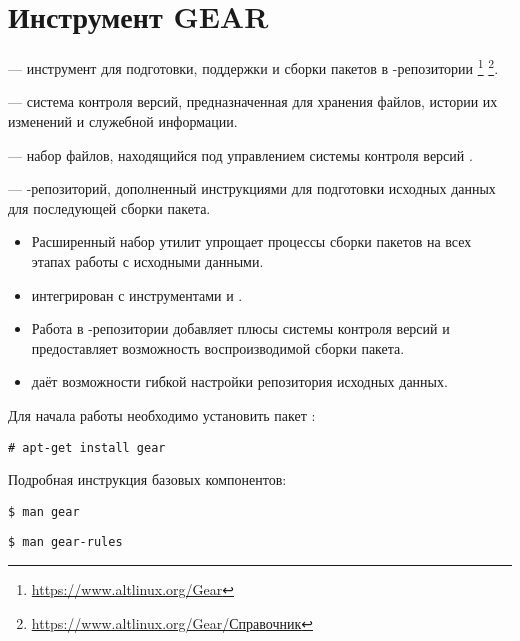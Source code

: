 \hypertarget{4}{\chapter{Инструмент GEAR}}\label{chapter-gear}
 ---
инструмент для подготовки, поддержки и сборки пакетов в -репозитории%
\footnote{\href{https://www.altlinux.org/Gear}{https://www.altlinux.org/Gear}}%
\footnote{\href{https://www.altlinux.org/Gear/\%D0\%A1\%D0\%BF\%D1\%80\%D0\%B0\%D0\%B2\%D0\%BE\%D1\%87\%D0\%BD\%D0\%B8\%D0\%BA}{https://www.altlinux.org/Gear/Справочник}}.


 --- система контроля версий, предназначенная для хранения файлов, истории
их изменений и служебной информации.

 --- набор файлов, находящийся под управлением системы
контроля версий .

 ---  -репозиторий, дополненный 
 инструкциями для подготовки исходных данных для последующей сборки пакета.

\begin{itemize}
	\item Расширенный набор утилит упрощает процессы сборки пакетов на всех этапах работы с исходными данными.
	\item {} интегрирован с инструментами  и .
	\item Работа в  -репозитории добавляет плюсы системы контроля версий и предоставляет возможность
	воспроизводимой сборки пакета.
	\item  {} даёт возможности гибкой настройки репозитория исходных данных.
\end{itemize}

Для начала работы необходимо установить пакет :
\begin{verbatim}
# apt-get install gear
\end{verbatim}

Подробная инструкция базовых компонентов:
 \begin{verbatim}
$ man gear
\end{verbatim}

\begin{verbatim}
$ man gear-rules
\end{verbatim}

